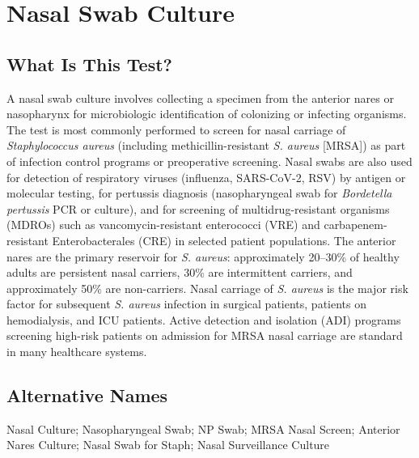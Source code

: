 \chapter{Nasal Swab Culture}

\section*{What Is This Test?}
A nasal swab culture involves collecting a specimen from the anterior nares or nasopharynx for microbiologic identification of colonizing or infecting organisms. The test is most commonly performed to screen for nasal carriage of \textit{Staphylococcus aureus} (including methicillin-resistant \textit{S. aureus} [MRSA]) as part of infection control programs or preoperative screening. Nasal swabs are also used for detection of respiratory viruses (influenza, SARS-CoV-2, RSV) by antigen or molecular testing, for pertussis diagnosis (nasopharyngeal swab for \textit{Bordetella pertussis} PCR or culture), and for screening of multidrug-resistant organisms (MDROs) such as vancomycin-resistant enterococci (VRE) and carbapenem-resistant Enterobacterales (CRE) in selected patient populations. The anterior nares are the primary reservoir for \textit{S. aureus}: approximately 20--30\% of healthy adults are persistent nasal carriers, 30\% are intermittent carriers, and approximately 50\% are non-carriers. Nasal carriage of \textit{S. aureus} is the major risk factor for subsequent \textit{S. aureus} infection in surgical patients, patients on hemodialysis, and ICU patients. Active detection and isolation (ADI) programs screening high-risk patients on admission for MRSA nasal carriage are standard in many healthcare systems.

\section*{Alternative Names}
Nasal Culture; Nasopharyngeal Swab; NP Swab; MRSA Nasal Screen; Anterior Nares Culture; Nasal Swab for Staph; Nasal Surveillance Culture

